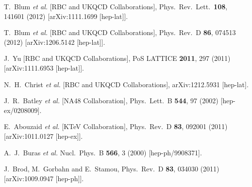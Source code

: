 \begin{thebibliography}{99}
  T.~Blum {\it et al.} [RBC and UKQCD Collaborations],
  Phys.\ Rev.\ Lett.\  {\bf 108}, 141601 (2012)
  [arXiv:1111.1699 [hep-lat]].

  T.~Blum {\it et al.} [RBC and UKQCD Collaborations],
  Phys.\ Rev.\ D {\bf 86}, 074513 (2012)
  [arXiv:1206.5142 [hep-lat]].

  J.~Yu [RBC and UKQCD Collaborations],
  PoS LATTICE {\bf 2011}, 297 (2011)
  [arXiv:1111.6953 [hep-lat]].

  N.~H.~Christ {\it et al.} [RBC and UKQCD Collaborations],
  arXiv:1212.5931 [hep-lat].
  
  J.~R.~Batley {\it et al.}  [NA48 Collaboration],
  Phys.\ Lett.\ B {\bf 544}, 97 (2002)
  [hep-ex/0208009].
 
  E.~Abouzaid {\it et al.}  [KTeV Collaboration],
  Phys.\ Rev.\ D {\bf 83}, 092001 (2011)
  [arXiv:1011.0127 [hep-ex]].
  
  A.~J.~Buras {\it et al.}
  Nucl.\ Phys.\ B {\bf 566}, 3 (2000)
  [hep-ph/9908371].
  
  J.~Brod, M.~Gorbahn and E.~Stamou,
  Phys.\ Rev.\ D {\bf 83}, 034030 (2011)
  [arXiv:1009.0947 [hep-ph]].
  

\end{thebibliography}
